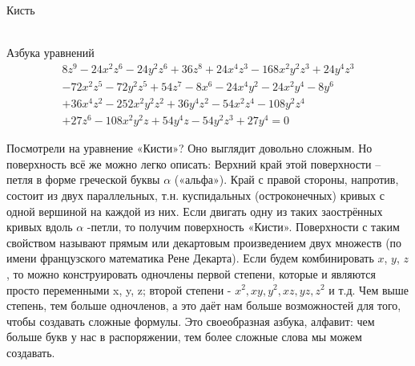 \documentclass[ru]{./../../common/SurferDesc}%
\begin{document}
\footnotesize





\begin{surferPage}
  \begin{surferTitle}Кисть\end{surferTitle}\\
Азбука уравнений
\vspace{-1ex}
{\scriptsize
\begin{gather*}
8z^9-24x^2z^6-24y^2z^6+36z^8+24x^4z^3-168x^2y^2z^3+24y^4z^3\\
-72x^2z^5-72y^2z^5+54z^7-8x^6-24x^4y^2-24x^2y^4-8y^6\\
+ 36x^4z^2-252x^2y^2z^2+36y^4z^2- 54x^2z^4-108y^2z^4\\
 + 27z^6-108x^2y^2z + 54y^4z-54y^2z^3 + 27y^4 = 0
\end{gather*}}
\vspace{-7ex}

Посмотрели на уравнение «Кисти»? Оно выглядит довольно сложным. Но поверхность всё же можно легко описать: Верхний край этой поверхности – петля в форме греческой буквы $\alpha$ («альфа»). Край с правой стороны, напротив, состоит из двух параллельных, т.н. куспидальных (остроконечных) кривых с одной вершиной на каждой из них. Если двигать одну из таких заострённых кривых вдоль $\alpha$ -петли, то получим поверхность «Кисти». Поверхности с таким свойством называют прямым или декартовым произведением двух множеств (по имени французского математика Рене Декарта).
%
Если будем комбинировать  $x$, $y$, $z$, то можно конструировать одночлены первой степени, которые и являются просто переменными x, y, z; второй степени - $x^2, xy, y^2, xz, yz, z^2$ и т.д. Чем выше степень, тем больше одночленов, а это даёт нам больше возможностей для того, чтобы создавать сложные формулы. Это своеобразная азбука, алфавит: чем больше букв у нас в распоряжении, тем более сложные слова мы можем создавать.

  \begin{surferText}
     \end{surferText}
\end{surferPage}
\end{document}
